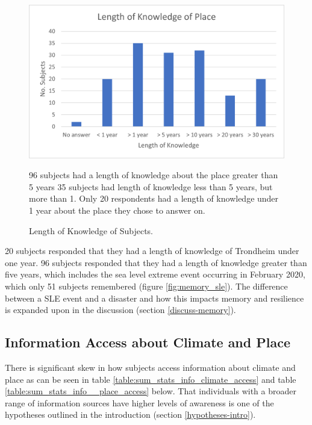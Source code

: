 \begin{figure}[H]
    \centering
    \includegraphics{fig_results/long_know.png}
    \caption{Length of Knowledge of Subjects.}{ 96 subjects had a length of knowledge about the place greater than 5 years 35 subjects had length of knowledge less than 5 years, but more than 1. Only 20 respondents had a length of knowledge under 1 year about the place they chose to answer on.}
    \label{fig:long_know}
\end{figure}

20 subjects responded that they had a length of knowledge of Trondheim under one year. 96 subjects responded that they had a length of knowledge greater than five years, which includes the sea level extreme event occurring in February 2020, which only 51 subjects remembered (figure \ref{fig:memory_sle}). The difference between a SLE event and a disaster and how this impacts memory and resilience is expanded upon in the discussion (section \ref{discuss-memory}).



\subsection{Information Access about Climate and Place}

There is significant skew in how subjects access information about climate and place as can be seen in table \ref{table:sum_stats_info_climate_access} and table \ref{table:sum_stats_info__place_access} below. That individuals with a broader range of information sources have higher levels of awareness is one of the hypotheses outlined in the introduction (section \ref{hypotheses-intro}). 


